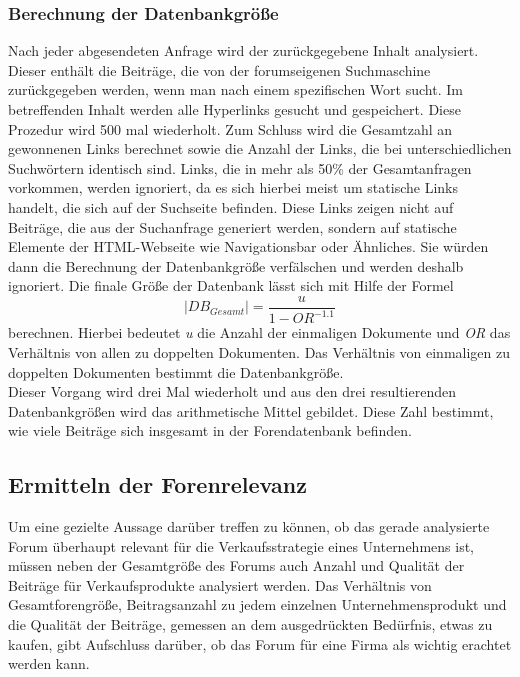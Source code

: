 \subsubsection{Berechnung der Datenbankgröße}
Nach jeder abgesendeten Anfrage wird der zurückgegebene Inhalt analysiert. Dieser enthält die Beiträge, die von der 
forumseigenen Suchmaschine zurückgegeben werden, wenn man nach einem spezifischen Wort sucht. Im betreffenden Inhalt werden alle Hyperlinks gesucht und gespeichert. Diese Prozedur wird 500 mal wiederholt. Zum Schluss wird die Gesamtzahl an gewonnenen Links berechnet sowie die Anzahl der Links, die bei unterschiedlichen Suchwörtern identisch sind. Links, die in mehr als 50\% der Gesamtanfragen vorkommen, werden ignoriert, da es sich hierbei meist um statische Links handelt, die sich auf der Suchseite befinden. Diese Links zeigen nicht auf Beiträge, die aus der Suchanfrage generiert werden, sondern auf statische Elemente der HTML-Webseite wie Navigationsbar oder Ähnliches. Sie würden dann die Berechnung der Datenbankgröße verfälschen und werden deshalb ignoriert.
Die finale Größe der Datenbank lässt sich mit Hilfe der Formel \[|DB_{Gesamt}| = \frac{u}{1-OR^{-1.1}}\] berechnen. Hierbei bedeutet \textit{u} die Anzahl der einmaligen Dokumente und \textit{OR} das Verhältnis von allen zu doppelten Dokumenten. Das Verhältnis von einmaligen zu doppelten Dokumenten bestimmt die Datenbankgröße\cite{lu2008efficient}.\\
Dieser Vorgang wird drei Mal wiederholt und aus den drei resultierenden Datenbankgrößen wird das arithmetische Mittel gebildet. Diese Zahl bestimmt, wie viele Beiträge sich insgesamt in der Forendatenbank befinden.



\subsection{Ermitteln der Forenrelevanz}
Um eine gezielte Aussage darüber treffen zu können, ob das gerade analysierte Forum überhaupt relevant für die Verkaufsstrategie eines Unternehmens ist, müssen neben der Gesamtgröße des Forums auch Anzahl und Qualität der Beiträge für Verkaufsprodukte analysiert werden. Das Verhältnis von Gesamtforengröße, Beitragsanzahl zu jedem einzelnen Unternehmensprodukt und die Qualität der Beiträge, gemessen an dem ausgedrückten Bedürfnis, etwas zu kaufen, gibt Aufschluss darüber, ob das Forum für eine Firma als wichtig erachtet werden kann.


